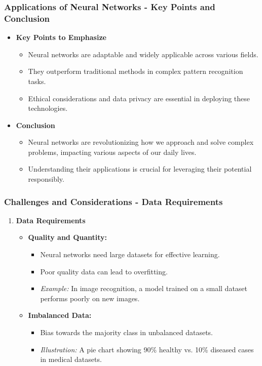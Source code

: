 \documentclass[aspectratio=169]{beamer}
\begin{document}
\begin{frame}[fragile]
    \frametitle{Applications of Neural Networks - Key Points and Conclusion}
    \begin{itemize}
        \item \textbf{Key Points to Emphasize}
            \begin{itemize}
                \item Neural networks are adaptable and widely applicable across various fields.
                \item They outperform traditional methods in complex pattern recognition tasks.
                \item Ethical considerations and data privacy are essential in deploying these technologies.
            \end{itemize}

        \item \textbf{Conclusion}
            \begin{itemize}
                \item Neural networks are revolutionizing how we approach and solve complex problems, impacting various aspects of our daily lives.
                \item Understanding their applications is crucial for leveraging their potential responsibly.
            \end{itemize}
    \end{itemize}
\end{frame}

\begin{frame}[fragile]
    \frametitle{Challenges and Considerations - Data Requirements}
    \begin{enumerate}
        \item \textbf{Data Requirements}
        \begin{itemize}
            \item \textbf{Quality and Quantity:} 
            \begin{itemize}
                \item Neural networks need large datasets for effective learning.
                \item Poor quality data can lead to overfitting.
                \item \textit{Example:} In image recognition, a model trained on a small dataset performs poorly on new images.
            \end{itemize} 
            \item \textbf{Imbalanced Data:}
            \begin{itemize}
                \item Bias towards the majority class in unbalanced datasets.
                \item \textit{Illustration:} A pie chart showing 90\% healthy vs. 10\% diseased cases in medical datasets.
            \end{itemize}
        \end{itemize}
    \end{enumerate}
\end{frame}
\end{document}
